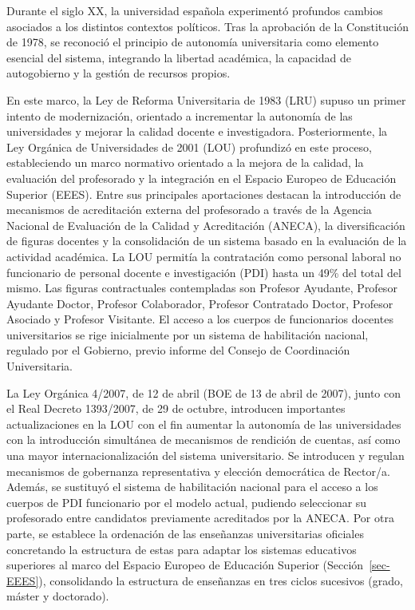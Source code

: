 \documentclass[
  11pt,
  a4paper,
  twoside]{scrreprt}
\begin{document}
Durante el siglo XX, la universidad española experimentó profundos
cambios asociados a los distintos contextos políticos. Tras la
aprobación de la Constitución de 1978, se reconoció el principio de
autonomía universitaria como elemento esencial del sistema, integrando
la libertad académica, la capacidad de autogobierno y la gestión de
recursos propios.

En este marco, la Ley de Reforma Universitaria de 1983 (LRU) supuso un
primer intento de modernización, orientado a incrementar la autonomía de
las universidades y mejorar la calidad docente e investigadora.
Posteriormente, la Ley Orgánica de Universidades de 2001 (LOU)
profundizó en este proceso, estableciendo un marco normativo orientado a
la mejora de la calidad, la evaluación del profesorado y la integración
en el Espacio Europeo de Educación Superior (EEES). Entre sus
principales aportaciones destacan la introducción de mecanismos de
acreditación externa del profesorado a través de la Agencia Nacional de
Evaluación de la Calidad y Acreditación (ANECA), la diversificación de
figuras docentes y la consolidación de un sistema basado en la
evaluación de la actividad académica. La LOU permitía la contratación
como personal laboral no funcionario de personal docente e investigación
(PDI) hasta un 49\% del total del mismo. Las figuras contractuales
contempladas son Profesor Ayudante, Profesor Ayudante Doctor, Profesor
Colaborador, Profesor Contratado Doctor, Profesor Asociado y Profesor
Visitante. El acceso a los cuerpos de funcionarios docentes
universitarios se rige inicialmente por un sistema de habilitación
nacional, regulado por el Gobierno, previo informe del Consejo de
Coordinación Universitaria.

La Ley Orgánica 4/2007, de 12 de abril (BOE de 13 de abril de 2007),
junto con el Real Decreto 1393/2007, de 29 de octubre, introducen
importantes actualizaciones en la LOU con el fin aumentar la autonomía
de las universidades con la introducción simultánea de mecanismos de
rendición de cuentas, así como una mayor internacionalización del
sistema universitario. Se introducen y regulan mecanismos de gobernanza
representativa y elección democrática de Rector/a. Además, se sustituyó
el sistema de habilitación nacional para el acceso a los cuerpos de PDI
funcionario por el modelo actual, pudiendo seleccionar su profesorado
entre candidatos previamente acreditados por la ANECA. Por otra parte,
se establece la ordenación de las enseñanzas universitarias oficiales
concretando la estructura de estas para adaptar los sistemas educativos
superiores al marco del Espacio Europeo de Educación Superior
(Sección~\ref{sec-EEES}), consolidando la estructura de enseñanzas en
tres ciclos sucesivos (grado, máster y doctorado).
\end{document}
